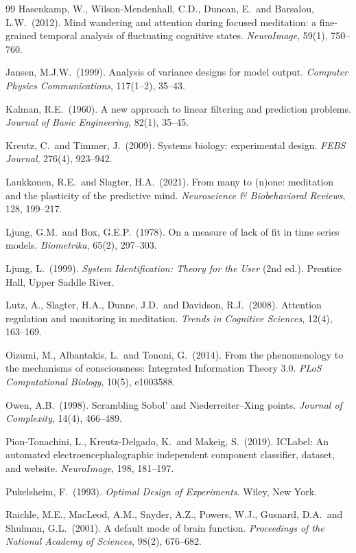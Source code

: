 \begin{thebibliography}{99}
Hasenkamp, W., Wilson-Mendenhall, C.D., Duncan, E.\ and Barsalou, L.W.\ (2012).
Mind wandering and attention during focused meditation: a fine-grained temporal analysis of fluctuating cognitive states.
\textit{NeuroImage}, 59(1), 750--760.

Jansen, M.J.W.\ (1999).
Analysis of variance designs for model output.
\textit{Computer Physics Communications}, 117(1--2), 35--43.

Kalman, R.E.\ (1960).
A new approach to linear filtering and prediction problems.
\textit{Journal of Basic Engineering}, 82(1), 35--45.

Kreutz, C.\ and Timmer, J.\ (2009).
Systems biology: experimental design.
\textit{FEBS Journal}, 276(4), 923--942.

Laukkonen, R.E.\ and Slagter, H.A.\ (2021).
From many to (n)one: meditation and the plasticity of the predictive mind.
\textit{Neuroscience \& Biobehavioral Reviews}, 128, 199--217.

Ljung, G.M.\ and Box, G.E.P.\ (1978).
On a measure of lack of fit in time series models.
\textit{Biometrika}, 65(2), 297--303.

Ljung, L.\ (1999).
\textit{System Identification: Theory for the User} (2nd ed.). Prentice Hall, Upper Saddle River.

Lutz, A., Slagter, H.A., Dunne, J.D.\ and Davidson, R.J.\ (2008).
Attention regulation and monitoring in meditation.
\textit{Trends in Cognitive Sciences}, 12(4), 163--169.

Oizumi, M., Albantakis, L.\ and Tononi, G.\ (2014).
From the phenomenology to the mechanisms of consciousness: Integrated Information Theory 3.0.
\textit{PLoS Computational Biology}, 10(5), e1003588.

Owen, A.B.\ (1998).
Scrambling Sobol' and Niederreiter--Xing points.
\textit{Journal of Complexity}, 14(4), 466--489.

Pion-Tonachini, L., Kreutz-Delgado, K.\ and Makeig, S.\ (2019).
ICLabel: An automated electroencephalographic independent component classifier, dataset, and website.
\textit{NeuroImage}, 198, 181--197.

Pukelsheim, F.\ (1993).
\textit{Optimal Design of Experiments}. Wiley, New York.

Raichle, M.E., MacLeod, A.M., Snyder, A.Z., Powers, W.J., Gusnard, D.A.\ and Shulman, G.L.\ (2001).
A default mode of brain function.
\textit{Proceedings of the National Academy of Sciences}, 98(2), 676--682.


\end{thebibliography}
